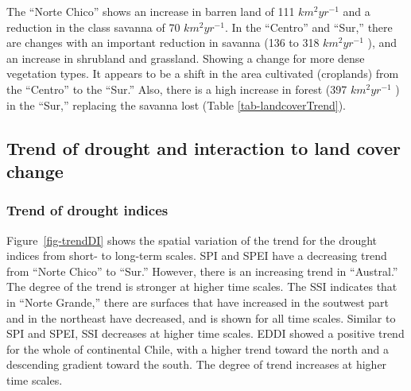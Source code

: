 \documentclass[
  authoryear,
  preprint,
  3p,
  onecolumn]{elsarticle}
\begin{document}
The ``Norte Chico'' shows an increase in barren land of 111
\(km^2 yr^{-1}\) and a reduction in the class savanna of 70
\(km^2 yr^{-1}\). In the ``Centro'' and ``Sur,'' there are changes with
an important reduction in savanna (136 to 318 \(km^2 yr^{-1}\) ), and an
increase in shrubland and grassland. Showing a change for more dense
vegetation types. It appears to be a shift in the area cultivated
(croplands) from the ``Centro'' to the ``Sur.'' Also, there is a high
increase in forest (397 \(km^2 yr^{-1}\) ) in the ``Sur,'' replacing the
savanna lost (Table \ref{tab-landcoverTrend}).

\hypertarget{trend-of-drought-and-interaction-to-land-cover-change-1}{%
\subsection{Trend of drought and interaction to land cover
change}\label{trend-of-drought-and-interaction-to-land-cover-change-1}}

\hypertarget{trend-of-drought-indices-1}{%
\subsubsection{Trend of drought
indices}\label{trend-of-drought-indices-1}}

Figure~\ref{fig-trendDI} shows the spatial variation of the trend for
the drought indices from short- to long-term scales. SPI and SPEI have a
decreasing trend from ``Norte Chico'' to ``Sur.'' However, there is an
increasing trend in ``Austral.'' The degree of the trend is stronger at
higher time scales. The SSI indicates that in ``Norte Grande,'' there
are surfaces that have increased in the soutwest part and in the
northeast have decreased, and is shown for all time scales. Similar to
SPI and SPEI, SSI decreases at higher time scales. EDDI showed a
positive trend for the whole of continental Chile, with a higher trend
toward the north and a descending gradient toward the south. The degree
of trend increases at higher time scales.

\blandscape
\end{document}

